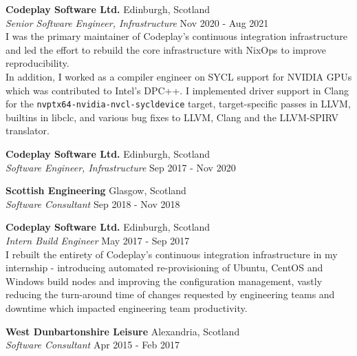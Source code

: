 \documentclass[a4paper]{article}
\begin{document}
\textbf{Codeplay Software Ltd.} \hfill {\color{gray} Edinburgh, Scotland} \\
\textit{Senior Software Engineer, Infrastructure} \hfill {\color{gray} Nov 2020 - Aug 2021} \\
\vspace{2mm}
I was the primary maintainer of Codeplay's continuous integration infrastructure and led the effort
to rebuild the core infrastructure with NixOps to improve reproducibility. \\
\vspace{2mm}
In addition, I worked as a compiler engineer on SYCL support for NVIDIA GPUs which was contributed
to Intel's DPC++. I implemented driver support in Clang for the
\verb|nvptx64-nvidia-nvcl-sycldevice| target, target-specific passes in LLVM, builtins in libclc,
and various bug fixes to LLVM, Clang and the LLVM-SPIRV translator.
\vspace{2mm}

\textbf{Codeplay Software Ltd.} \hfill {\color{gray} Edinburgh, Scotland} \\
\textit{Software Engineer, Infrastructure} \hfill {\color{gray} Sep 2017 - Nov 2020} \\
\vspace{2mm}

\textbf{Scottish Engineering} \hfill {\color{gray} Glasgow, Scotland} \\
\textit{Software Consultant} \hfill {\color{gray} Sep 2018 - Nov 2018} \\
\vspace{2mm}

\textbf{Codeplay Software Ltd.} \hfill {\color{gray} Edinburgh, Scotland} \\
\textit{Intern Build Engineer} \hfill {\color{gray} May 2017 - Sep 2017} \\
\vspace{2mm}
I rebuilt the entirety of Codeplay's continuous integration infrastructure in my internship -
introducing automated re-provisioning of Ubuntu, CentOS and Windows build nodes and improving the
configuration management, vastly reducing the turn-around time of changes requested by engineering
teams and downtime which impacted engineering team productivity.
\vspace{2mm}

\textbf{West Dunbartonshire Leisure} \hfill {\color{gray} Alexandria, Scotland} \\
\textit{Software Consultant} \hfill {\color{gray} Apr 2015 - Feb 2017} \\
\vspace{2mm}
\end{document}
